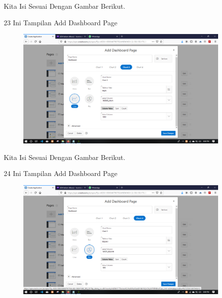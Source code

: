 \begin{enumerate}
\par
Kita Isi Sesuai Dengan Gambar Berikut.

\newpage
\item[23]Ini Tampilan Add Dashboard Page

\begin{figure}[!htbp]
    \begin{center}
    \includegraphics[scale=0.2]{figures/26.png}
    \end{center}   
    \end{figure}
    
\par
Kita Isi Sesuai Dengan Gambar Berikut.

\item[24]Ini Tampilan Add Dashboard Page

\begin{figure}[!htbp]
    \begin{center}
    \includegraphics[scale=0.2]{figures/27.png}
    \end{center}   
    \end{figure}
    

\end{enumerate}
